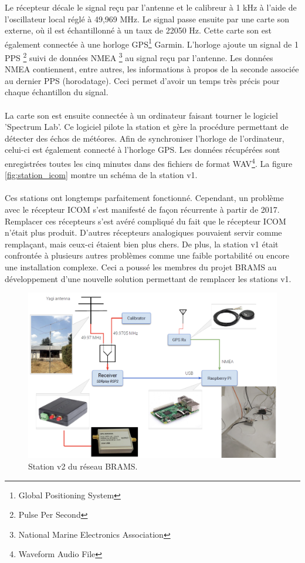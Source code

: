 \documentclass[11pt]{article}
\begin{document}
\newpage

Le récepteur décale le signal reçu par l'antenne et le calibreur à 1 kHz à l'aide de l'oscillateur local réglé à 49,969 MHz.
Le signal passe ensuite par une carte son externe, où il est échantillonné à un taux de 22050 Hz.
Cette carte son est également connectée à une horloge GPS\footnote{Global Positioning System} Garmin.
L'horloge ajoute un signal de 1 PPS \footnote{Pulse Per Second} suivi de données NMEA \footnote{National Marine Electronics Association} au signal reçu par l'antenne.
Les données NMEA contiennent, entre autres, les informations à propos de la seconde associée au dernier PPS (horodatage).
Ceci permet d'avoir un temps très précis pour chaque échantillon du signal.
\\
\\
La carte son est ensuite connectée à un ordinateur faisant tourner le logiciel 'Spectrum Lab'.
Ce logiciel pilote la station et gère la procédure permettant de détecter des échos de météores.
Afin de synchroniser l'horloge de l'ordinateur, celui-ci est également connecté à l'horloge GPS.
Les données récupérées sont enregistrées toutes les cinq minutes dans des fichiers de format WAV\footnote{Waveform Audio File}.
La figure \ref{fig:station_icom} montre un schéma de la station v1.\\
\\
Ces stations ont longtemps parfaitement fonctionné.
Cependant, un problème avec le récepteur ICOM s'est manifesté de façon récurrente à partir de 2017.
Remplacer ces récepteurs s'est avéré compliqué du fait que le récepteur ICOM n'était plus produit.
D'autres récepteurs analogiques pouvaient servir comme remplaçant, mais ceux-ci étaient bien plus chers.
De plus, la station v1 était confrontée à plusieurs autres problèmes comme une faible portabilité ou encore une installation complexe.
Ceci a poussé les membres du projet BRAMS au développement d'une nouvelle solution permettant de remplacer les stations v1.

\begin{figure}[h]
    \begin{center}
        \includegraphics[scale=0.3]{schema_rsp2.png}
        \caption{Station v2 du réseau BRAMS.}
        \label{fig:station_rsp2}
    \end{center}
\end{figure}
\end{document}
